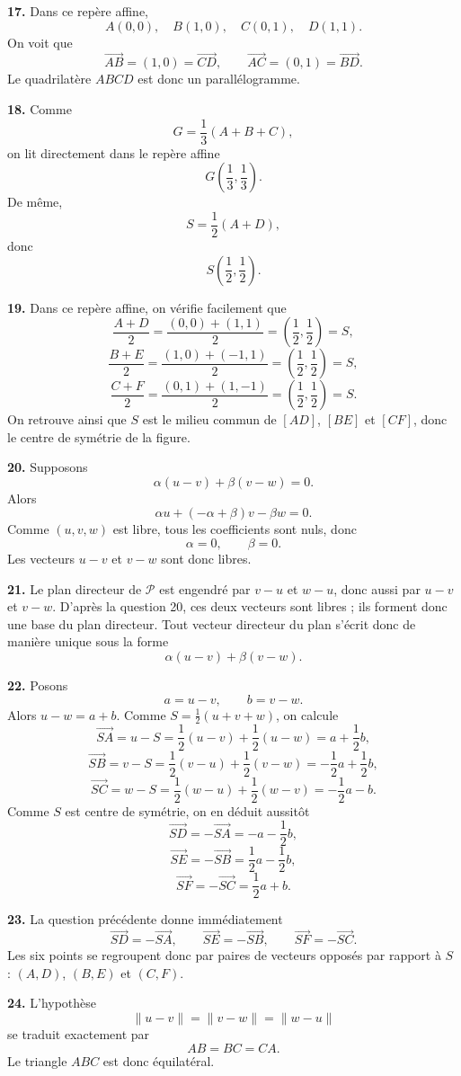 \documentclass[11pt,a4paper]{article}
\newcommand{\p}[1]{\medskip\noindent\textbf{#1.}}
\begin{document}
\p{17} Dans ce repère affine,
\[
A(0,0),\quad B(1,0),\quad C(0,1),\quad D(1,1).
\]
On voit que
\[
\overrightarrow{AB}=(1,0)=\overrightarrow{CD},
\qquad
\overrightarrow{AC}=(0,1)=\overrightarrow{BD}.
\]
Le quadrilatère $ABCD$ est donc un parallélogramme.

\p{18} Comme
\[
G=\frac13(A+B+C),
\]
on lit directement dans le repère affine
\[
G\left(\frac13,\frac13\right).
\]
De même,
\[
S=\frac12(A+D),
\]
donc
\[
S\left(\frac12,\frac12\right).
\]

\p{19} Dans ce repère affine, on vérifie facilement que
\[
\frac{A+D}{2}=\frac{(0,0)+(1,1)}{2}=\left(\frac12,\frac12\right)=S,
\]
\[
\frac{B+E}{2}=\frac{(1,0)+(-1,1)}{2}=\left(\frac12,\frac12\right)=S,
\]
\[
\frac{C+F}{2}=\frac{(0,1)+(1,-1)}{2}=\left(\frac12,\frac12\right)=S.
\]
On retrouve ainsi que $S$ est le milieu commun de $[AD]$, $[BE]$ et $[CF]$, donc le centre de symétrie de la figure.

\p{20} Supposons
\[
\alpha(u-v)+\beta(v-w)=0.
\]
Alors
\[
\alpha u+(-\alpha+\beta)v-\beta w=0.
\]
Comme $(u,v,w)$ est libre, tous les coefficients sont nuls, donc
\[
\alpha=0,\qquad \beta=0.
\]
Les vecteurs $u-v$ et $v-w$ sont donc libres.

\p{21} Le plan directeur de $\mathcal P$ est engendré par $v-u$ et $w-u$, donc aussi par $u-v$ et $v-w$. D'après la question 20, ces deux vecteurs sont libres ; ils forment donc une base du plan directeur. Tout vecteur directeur du plan s'écrit donc de manière unique sous la forme
\[
\alpha(u-v)+\beta(v-w).
\]

\p{22} Posons
\[
a=u-v,
\qquad
b=v-w.
\]
Alors $u-w=a+b$.
Comme $S=\frac12(u+v+w)$, on calcule
\[
\overrightarrow{SA}=u-S=\frac12(u-v)+\frac12(u-w)=a+\frac12 b,
\]
\[
\overrightarrow{SB}=v-S=\frac12(v-u)+\frac12(v-w)=-\frac12 a+\frac12 b,
\]
\[
\overrightarrow{SC}=w-S=\frac12(w-u)+\frac12(w-v)=-\frac12 a-b.
\]
Comme $S$ est centre de symétrie, on en déduit aussitôt
\[
\overrightarrow{SD}=-\overrightarrow{SA}=-a-\frac12 b,
\]
\[
\overrightarrow{SE}=-\overrightarrow{SB}=\frac12 a-\frac12 b,
\]
\[
\overrightarrow{SF}=-\overrightarrow{SC}=\frac12 a+b.
\]

\p{23} La question précédente donne immédiatement
\[
\overrightarrow{SD}=-\overrightarrow{SA},
\qquad
\overrightarrow{SE}=-\overrightarrow{SB},
\qquad
\overrightarrow{SF}=-\overrightarrow{SC}.
\]
Les six points se regroupent donc par paires de vecteurs opposés par rapport à $S$ : $(A,D)$, $(B,E)$ et $(C,F)$.

\p{24} L'hypothèse
\[
\|u-v\|=\|v-w\|=\|w-u\|
\]
se traduit exactement par
\[
AB=BC=CA.
\]
Le triangle $ABC$ est donc équilatéral.
\end{document}
